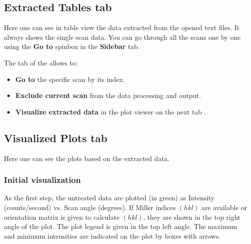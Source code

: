 \subsection{Extracted Tables tab}

Here one can see in table view the data extracted from the opened text files. It always shows the single scan data. You can go through all the scans one by one using the \textbf{Go to} spinbox in the \textbf{Sidebar}  tab.


The  tab of the  allows to:

\begin{itemize}
	\item \textbf{Go to} the specific scan by its index.
	\item \textbf{Exclude current scan} from the data processing and output.
	\item \textbf{Visualize extracted data} in the plot viewer on the next tab .
\end{itemize}

\newpage
\subsection{Visualized Plots tab}

Here one can see the plots based on the extracted data. 

\subsubsection{Initial visualization}

As the first step, the untreated data are plotted (in green) as Intensity (counts/second) vs. Scan angle (degrees). If Miller indices $(hkl)$ are available or orientation matrix is given to calculate $(hkl)$, they are shown in the top right angle of the plot. The plot legend is given in the top left angle. The maximum and minimum intensities are indicated on the plot by boxes with arrows. 


